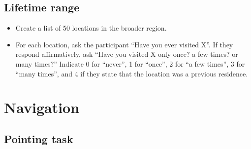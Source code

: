 \documentclass{article}
\begin{document}

\subsection{Lifetime range}

\begin{itemize}

\item Create a list of 50 locations in the broader region.

\item For each location, ask the participant ``Have you ever visited X''.  If they respond affirmatively, ask ``Have you visited X only once? a few times? or many times?''  Indicate 0 for ``never'', 1 for ``once'', 2 for ``a few times'', 3 for ``many times'', and 4 if they state that the location was a previous residence.

\end{itemize}



\section{Navigation}

\subsection{Pointing task} %
\end{document}

